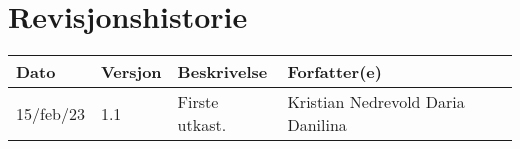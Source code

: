 \section*{Revisjonshistorie}

\begin{table}[H]
\centering
\begin{tabular}{|l|l|p{6cm}|p{4cm}|} 
\hline
\textbf{Dato} & \textbf{Versjon} & \textbf{Beskrivelse} & \textbf{Forfatter(e)}\\
\hline 
15/feb/23 & 1.1 & Firste utkast. & Kristian Nedrevold Daria Danilina\\
\hline
\end{tabular}
\end{table}

 